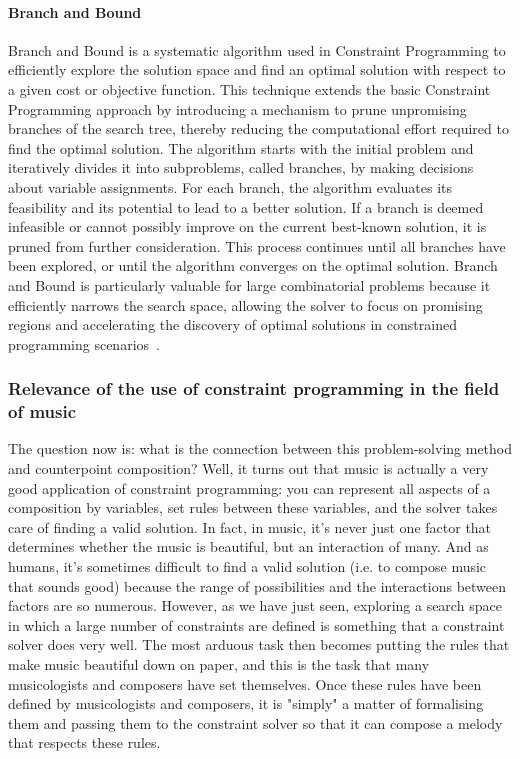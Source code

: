 \paragraph{Branch and Bound}
Branch and Bound is a systematic algorithm used in Constraint Programming to efficiently explore the solution space and find an optimal solution with respect to a given cost or objective function. This technique extends the basic Constraint Programming approach by introducing a mechanism to prune unpromising branches of the search tree, thereby reducing the computational effort required to find the optimal solution. The algorithm starts with the initial problem and iteratively divides it into subproblems, called branches, by making decisions about variable assignments. For each branch, the algorithm evaluates its feasibility and its potential to lead to a better solution. If a branch is deemed infeasible or cannot possibly improve on the current best-known solution, it is pruned from further consideration. This process continues until all branches have been explored, or until the algorithm converges on the optimal solution. Branch and Bound is particularly valuable for large combinatorial problems because it efficiently narrows the search space, allowing the solver to focus on promising regions and accelerating the discovery of optimal solutions in constrained programming scenarios~\cite{morrison2016branch}. 

\subsubsection{Relevance of the use of constraint programming in the field of music}
The question now is: what is the connection between this problem-solving method and counterpoint composition? Well, it turns out that music is actually a very good application of constraint programming: you can represent all aspects of a composition by variables, set rules between these variables, and the solver takes care of finding a valid solution. In fact, in music, it's never just one factor that determines whether the music is beautiful, but an interaction of many. And as humans, it's sometimes difficult to find a valid solution (i.e. to compose music that sounds good) because the range of possibilities and the interactions between factors are so numerous.  However, as we have just seen, exploring a search space in which a large number of constraints are defined is something that a constraint solver does very well. The most arduous task then becomes putting the rules that make music beautiful down on paper, and this is the task that many musicologists and composers have set themselves. Once these rules have been defined by musicologists and composers, it is "simply" a matter of formalising them and passing them to the constraint solver so that it can compose a melody that respects these rules.

